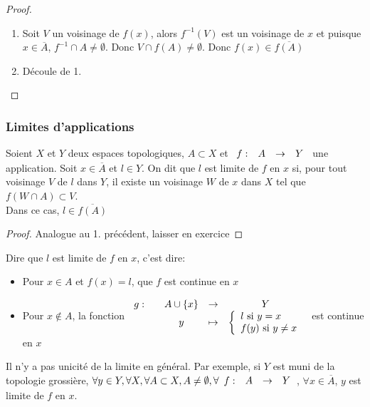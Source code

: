\documentclass[]{report}
\begin{document}
    \begin{proof}{}{}
        \begin{enumerate}
            \item Soit $V$ un voisinage de $f(x)$, alors $f^{-1}(V)$ est un voisinage de $x$ et puisque $x\in\overline{A}$, $f^{-1}\cap A\neq \emptyset$. Donc $V\cap f(A)\neq \emptyset$. Donc $f(x)\in\overline{f(A)}$
            \item Découle de 1.
        \end{enumerate}
    \end{proof}

    \subsubsection*{Limites d'applications}

    \begin{dfprop}{}{}
        Soient $X$ et $Y$ deux espaces topologiques, $A\subset X$ et $\begin{array}{ccccc} f : & A & \to & Y \end{array}$ une application. Soit $x\in\overline{A}$ et $l\in Y$. On dit que $l$ est limite de $f$ en $x$ si, pour tout voisinage $V$ de $l$ dans $Y$, il existe un voisinage $W$ de $x$ dans $X$ tel que $f(W\cap A)\subset V$.\\
        Dans ce cas, $l\in \overline{f(A)}$
    \end{dfprop}

    \begin{proof}{}{}
        Analogue au 1. précédent, laisser en exercice
    \end{proof}

    \begin{re}{}{}
        Dire que $l$ est limite de $f$ en $x$, c'est dire:
        \begin{itemize}
            \item Pour $x\in A$ et $f(x)=l$, que $f$ est continue en $x$
            \item Pour $x\notin A$, la fonction $\begin{array}{ccccc} g : & & A\cup\{x\} & \to & Y \\ & & y & \mapsto & \left\{\begin{array}{ll} l\text{ si }y=x\\ f(y)\text{ si }y\neq x \end{array} \right. \end{array}$ est continue en $x$
        \end{itemize}
    \end{re}

    \begin{re}{}{}
        Il n'y a pas unicité de la limite en général. Par exemple, si $Y$ est muni de la topologie grossière, $\forall y\in Y,\forall X,\forall A\subset X,A\neq \emptyset,\forall \begin{array}{ccccc} f : & A & \to & Y \end{array}$, $\forall x\in \overline{A}$, $y$ est limite de $f$ en $x$.
    \end{re}
\end{document}
